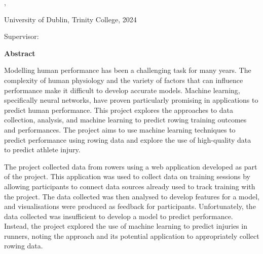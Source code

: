 \thispagestyle{plain}
\begin{center}
  \vspace{3cm}
  \textbf{\Huge\thesistitle}

  \begin{minipage}{12cm}
    \begin{center}
      \thesissubtitle
    \end{center}
  \end{minipage}

  \vspace{1cm}

  \authorname, \degree

  University of Dublin, Trinity College, 2024

  Supervisor: \supervisor

  \vspace{1.5cm}
  \textbf{Abstract}
\end{center}


Modelling human performance has been a challenging task for many years. The complexity of human physiology and the variety of factors that can influence performance make it difficult to develop accurate models. Machine learning, specifically neural networks, have proven particularly promising in applications to predict human performance. This project explores the approaches to data collection, analysis, and machine learning to predict rowing training outcomes and performances. The project aims to use machine learning techniques to predict performance using rowing data and explore the use of high-quality data to predict athlete injury. 

The project collected data from rowers using a web application developed as part of the project. This application was used to collect data on training sessions by allowing participants to connect data sources already used to track training with the project. The data collected was then analysed to develop features for a model, and visualisations were produced as feedback for participants. Unfortunately, the data collected was insufficient to develop a model to predict performance. Instead, the project explored the use of machine learning to predict injuries in runners, noting the approach and its potential application to appropriately collect rowing data.

